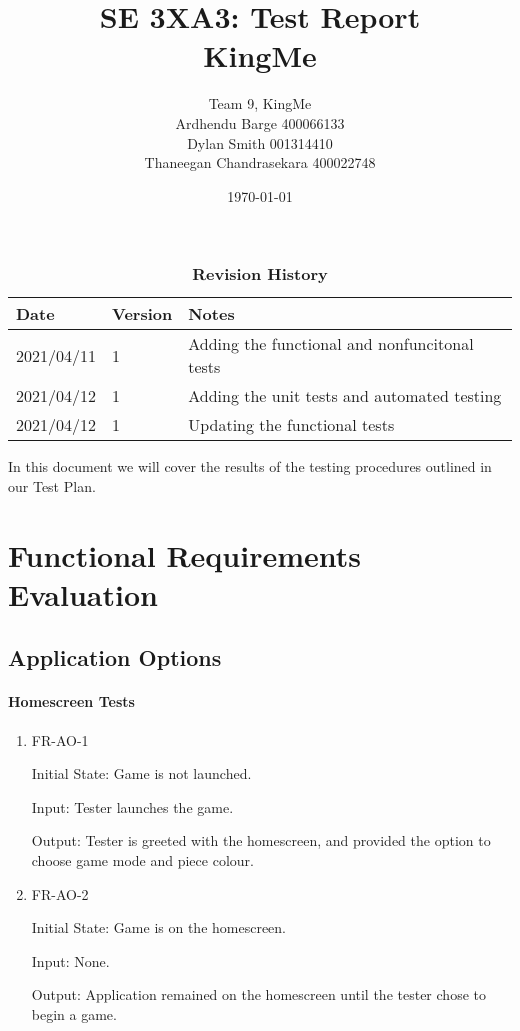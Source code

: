 \documentclass[12pt, titlepage]{article}
\title{SE 3XA3: Test Report\\KingMe}
\author{Team 9, KingMe
		\\ Ardhendu Barge 400066133
		\\ Dylan Smith 001314410
		\\ Thaneegan Chandrasekara 400022748
}
\date{\today}
\begin{document}
\maketitle

\tableofcontents
\listoftables
\listoffigures

\begin{table}[bp]
\caption{\bf Revision History}
\begin{tabularx}{\textwidth}{p{3cm}p{2cm}X}
\toprule {\bf Date} & {\bf Version} & {\bf Notes}\\
\midrule
2021/04/11 & 1 & Adding the functional and nonfuncitonal tests\\
2021/04/12 & 1 & Adding the unit tests and automated testing\\
2021/04/12 & 1 & Updating the functional tests\\
\bottomrule
\end{tabularx}
\end{table}

\newpage


In this document we will cover the results of the testing procedures outlined in our Test Plan.

\section{Functional Requirements Evaluation}

\subsection{Application Options}

\paragraph{Homescreen Tests}
\begin{enumerate}
    \item{FR-AO-1}
    \label{FR-AO-1}
    
    Initial State: Game is not launched.
    
    Input: Tester launches the game.
    
    Output: Tester is greeted with the homescreen, and provided the option to choose game mode and piece colour.
    \item{FR-AO-2}
    \label{FR-AO-2}    
    
    Initial State: Game is on the homescreen.
    
    Input: None.
    
    Output: Application remained on the homescreen until the tester chose to begin a game.
\end{enumerate}
\end{document}
